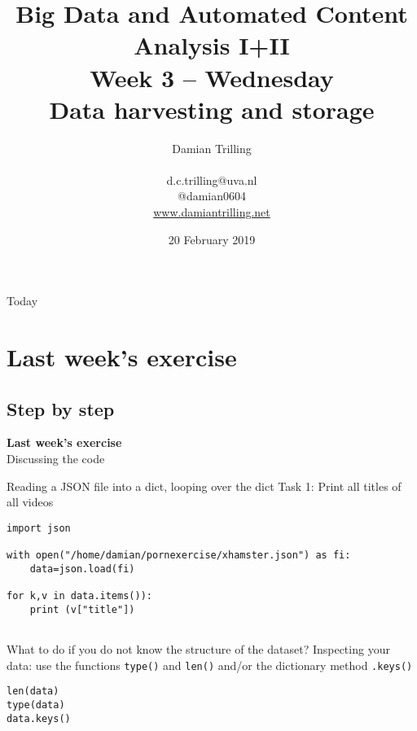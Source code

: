 \documentclass{beamer}
\title[Big Data and Automated Content Analysis]{\textbf{Big Data and Automated Content Analysis I+II} \\ Week 3 -- Wednesday \\  Data harvesting and storage}
\author[Damian Trilling]{Damian Trilling \\ ~ \\ \footnotesize{d.c.trilling@uva.nl \\@damian0604} \\ \url{www.damiantrilling.net}}
\date{20 February 2019}
\institute[UvA]{Afdeling Communicatiewetenschap \\Universiteit van Amsterdam}
\begin{document}
\begin{frame}{}
\titlepage
\end{frame}

\begin{frame}{Today}
\tableofcontents
\end{frame}



\section{Last week's exercise}
\subsection{Step by step}
\begin{frame}[plain]
\textbf{Last week's exercise}\\
\vspace{1cm}
Discussing the code
\end{frame}



\begin{frame}[fragile]{Reading a JSON file into a dict, looping over the dict}
Task 1: Print all titles of all videos
\begin{lstlisting}
import json

with open("/home/damian/pornexercise/xhamster.json") as fi:
    data=json.load(fi)

for k,v in data.items()):
    print (v["title"])
            
\end{lstlisting}
\end{frame}


\begin{frame}[fragile]{What to do if you do not know the structure of the dataset?}
	Inspecting your data: use the functions \texttt{type()} and \texttt{len()} and/or the dictionary method \texttt{.keys()}
\begin{lstlisting}
len(data)
type(data)
data.keys()
\end{lstlisting}
\end{frame}
\end{document}
